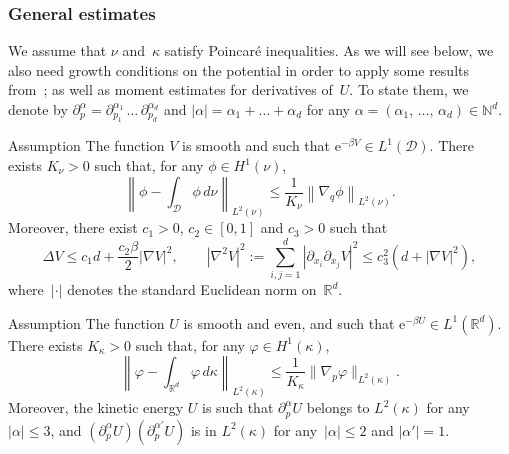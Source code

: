 \documentclass[10pt]{amsart}
\theoremstyle{definition}\newtheorem{defi}[theo]{Definition}\newtheorem{rema}[theo]{Remark}\newtheorem{exam}[theo]{Example}\newtheorem{exem}[theo]{Example}\newtheorem{nota}[theo]{Notation}
\newcommand{\rme}{\mathrm{e}}
\newcommand{\cD}{\mathcal{D}}
\newcommand{\R}{\mathbb{R}}
\newcommand{\bbN}{\mathbb{N}}
\renewcommand{\leq}{\leqslant}
\begin{document}
\subsubsection{General estimates}\label{eq:general_estimates_Langevin}

We assume that $\nu$ and~$\kappa$ satisfy Poincaré inequalities. As we will see below, we also need growth conditions on the potential in order to apply some results from~\cite{DMS15}; as well as moment estimates for derivatives of~$U$. To state them, we denote by $\partial_p^\alpha = \partial_{p_1}^{\alpha_1}\,\dots\, \partial_{p_d}^{\alpha_d}$ and $|\alpha| = \alpha_1 + \dots + \alpha_d$ for any $\alpha = (\alpha_1,\,\dots,\,\alpha_d) \in \bbN^d$.

\begin{enonce}{Assumption}\label{ass:Poincare_nu}
The function $V$ is smooth and such that $\rme^{-\beta V} \in L^1(\cD)$. There exists $K_\nu > 0$ such that, for any $\phi \in H^1(\nu)$,
\[
\left\| \phi - \int_{\cD} \phi \, d\nu \right\|_{L^2(\nu)} \leq \frac{1}{K_\nu}\left\| \nabla_q \phi\right\|_{L^2(\nu)}.
\]
Moreover, there exist $c_1 > 0$, $c_2 \in [0,1]$ and $c_3 > 0$ such that
\begin{equation}\label{eq:regularization condition}
\Delta V \leq c_1 d + \frac {c_2 \beta} 2 \left| \nabla V \right|^2, \qquad \left|\nabla^2 V \right|^2 := \sum_{i,j=1}^d \left|\partial_{x_i}\partial_{x_j}V\right|^2 \leq c_3^2 \left(d + \left| \nabla V \right|^2 \right),
\end{equation}
where~$|\cdot|$ denotes the standard Euclidean norm on~$\R^d$.
\end{enonce}

\begin{enonce}{Assumption}\label{ass:Poincare_kappa}
The function $U$ is smooth and even, and such that $\rme^{-\beta U} \in L^1(\R^d)$. There exists $K_\kappa > 0$ such that, for any $\varphi \in H^1(\kappa)$,
\[
\left\| \varphi - \int_{\R^d} \varphi \, d\kappa \right\|_{L^2(\kappa)} \leq \frac{1}{K_\kappa} \| \nabla_p \varphi \|_{L^2(\kappa)}.
\]
Moreover, the kinetic energy $U$ is such that $\partial_p^\alpha U$ belongs to $L^2(\kappa)$ for any $|\alpha| \leq 3$, and $(\partial_p^{\alpha} U) (\partial_p^{\alpha'} U)$ is in $L^2(\kappa)$ for any~$|\alpha| \leq 2$ and $|\alpha'| = 1$.
\end{enonce}
\end{document}
